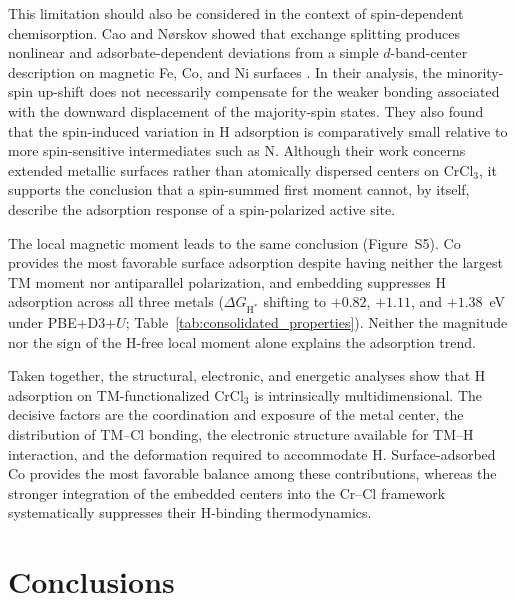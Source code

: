 \documentclass[journal=jacsat,manuscript=article]{achemso}
\begin{document}
This limitation should also be considered in the context of spin-dependent chemisorption. Cao and N{\o}rskov showed that exchange splitting produces nonlinear and adsorbate-dependent deviations from a simple $d$-band-center description on magnetic Fe, Co, and Ni surfaces \cite{doi:10.1021/acscatal.2c06319}. In their analysis, the minority-spin up-shift does not necessarily compensate for the weaker bonding associated with the downward displacement of the majority-spin states. They also found that the spin-induced variation in H adsorption is comparatively small relative to more spin-sensitive intermediates such as N. Although their work concerns extended metallic surfaces rather than atomically dispersed centers on CrCl$_3$, it supports the conclusion that a spin-summed first moment cannot, by itself, describe the adsorption response of a spin-polarized active site.

{\color{revcolor}%
  The local magnetic moment leads to the same conclusion (Figure~S5). Co provides the most favorable surface adsorption despite having neither the largest TM moment nor antiparallel polarization, and embedding suppresses H adsorption across all three metals ($\Delta G_{\mathrm{H}^*}$ shifting to $+0.82$, $+1.11$, and $+1.38$~eV under PBE+D3+$U$; Table~\ref{tab:consolidated_properties}). Neither the magnitude nor the sign of the  H-free local moment alone explains the adsorption trend.
\par}

Taken together, the structural, electronic, and energetic analyses show that H adsorption on TM-functionalized CrCl$_3$ is intrinsically multidimensional. The decisive factors are the coordination and exposure of the metal center, the distribution of TM--Cl bonding, the electronic structure available for TM--H interaction, and the deformation required to accommodate H. Surface-adsorbed Co provides the most favorable balance among these contributions, whereas the stronger integration of the embedded centers into the Cr--Cl framework systematically suppresses their H-binding thermodynamics.

\section{Conclusions}
\end{document}
